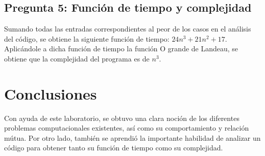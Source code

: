 \documentclass[11pt]{article}
\begin{document}
\subsection{Pregunta 5: Función de tiempo y complejidad}
Sumando todas las entradas correspondientes al peor de los casos en el análisis del código, se obtiene la siguiente función de tiempo: $24n^{3}+21n^{2}+17$.
Aplicándole a dicha función de tiempo la función O grande de Landeau, se obtiene que la complejidad del programa es de $n^{3}$.


\section{Conclusiones}
Con ayuda de este laboratorio, se obtuvo una clara noción de los diferentes problemas computacionales existentes, así como su comportamiento y relación mútua. Por otro lado, también se aprendió la importante habilidad de analizar un código para obtener tanto su función de tiempo como su complejidad.
\end{document}
